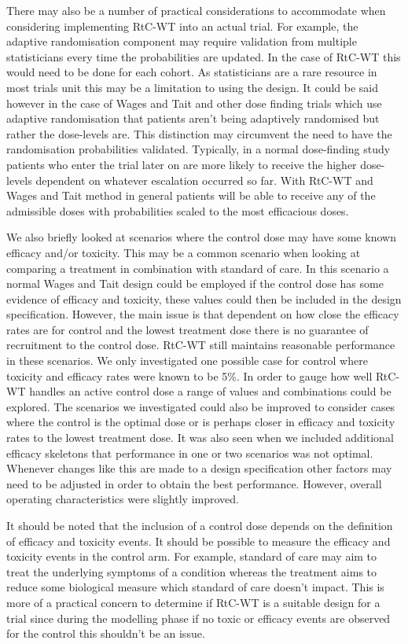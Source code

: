 There may also be a number of practical considerations to accommodate when considering implementing RtC-WT into an actual trial. For example, the adaptive randomisation component may require validation from multiple statisticians every time the probabilities are updated. In the case of RtC-WT this would need to be done for each cohort. As statisticians are a rare resource in most trials unit this may be a limitation to using the design. It could be said however in the case of Wages and Tait and other dose finding trials which use adaptive randomisation that patients aren't being adaptively randomised but rather the dose-levels are. This distinction may circumvent the need to have the randomisation probabilities validated. Typically, in a normal dose-finding study patients who enter the trial later on are more likely to receive the higher dose-levels dependent on whatever escalation occurred so far. With RtC-WT and Wages and Tait method in general patients will be able to receive any of the admissible doses with probabilities scaled to the most efficacious doses. 

We also briefly looked at scenarios where the control dose may have some known efficacy and/or toxicity. This may be a common scenario when looking at comparing a treatment in combination with standard of care. In this scenario a normal Wages and Tait design could be employed if the control dose has some evidence of efficacy and toxicity, these values could then be included in the design specification. However, the main issue is that dependent on how close the efficacy rates are for control and the lowest treatment dose there is no guarantee of recruitment to the control dose. RtC-WT still maintains reasonable performance in these scenarios. We only investigated one possible case for control where toxicity and efficacy rates were known to be 5\%. In order to gauge how well RtC-WT handles an active control dose a range of values and combinations could be explored. The scenarios we investigated could also be improved to consider cases where the control is the optimal dose or is perhaps closer in efficacy and toxicity rates to the lowest treatment dose. It was also seen when we included additional efficacy skeletons that performance in one or two scenarios was not optimal. Whenever changes like this are made to a design specification other factors may need to be adjusted in order to obtain the best performance. However, overall operating characteristics were slightly improved.  

It should be noted that the inclusion of a control dose depends on the definition of efficacy and toxicity events. It should be possible to measure the efficacy and toxicity events in the control arm. For example, standard of care may aim to treat the underlying symptoms of a condition whereas the treatment aims to reduce some biological measure which standard of care doesn't impact. This is more of a practical concern to determine if RtC-WT is a suitable design for a trial since during the modelling phase if no toxic or efficacy events are observed for the control this shouldn't be an issue. 

